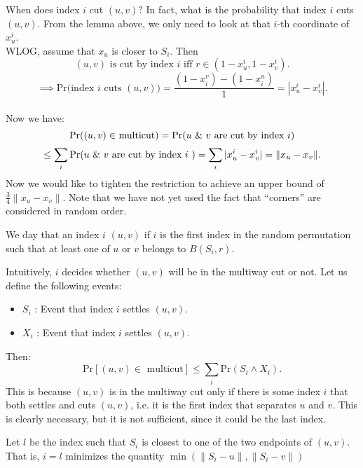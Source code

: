 \documentclass[../main/main.tex]{subfiles}
\begin{document}
When does index $i$ cut $(u,v)?$ In fact, what is the probability that index  $i$ cuts $(u,v).$ From the lemma above, we only need to look at that $i$-th coordinate of $x_u^i$. \\

WLOG, assume that $x_u$ is closer to $S_i$. Then \[\text{$(u,v)$ is cut by index $i$ iff  $r\in (1-x^i_u,1-x^i_v)$}.\] \[
	\implies \text{Pr(index $i$ cuts $(u,v)$)}= \frac{(1-x^v_i)-(1-x^u_i)}{1}=|x^i_u-x^i_v|
.\] \\
Now we have: \[
	\text{Pr($(u,v)\in $ multicut)}= \text{Pr($u $ \& $  v$ are cut by index  $i$)}\] \[
	\le \sum_i \text{Pr($u $ \& $ v$ are cut by index $i$ )}
	=\sum_i |x^i_u-x^i_v|= \|x_u-x_v\|.\] 
Now we would like to tighten the restriction to achieve an upper bound of $\frac{3}{4}\|x_u-x_v\|$. Note that we have not yet used the fact that ``corners'' are considered in random order.

\begin{definition}
	We day that an index $i$  $(u,v)$ if $i$ is the first index in the random permutation such that at least one of $u$ or $v$ belongs to $B(S_i,r)$.
\end{definition} 

Intuitively, $i$ decides whether $(u,v)$ will be in the multiway cut or not. Let us define the following events:
\begin{itemize}
	\item $S_i$ : Event that index  $i$ settles $(u,v)$.
	\item $X_i$ : Event that index $i$ settles $(u,v)$.
\end{itemize}
Then: \[
	\text{Pr}\left[ (u,v)\in \text{ multicut} \right] \le \sum_i \text{Pr}(S_i \wedge X_i)
.\] This is because $(u,v)$ is in the multiway cut only if there is some index $i$ that both settles and cuts $(u,v)$, i.e. it is the first index that separates $u$ and $v$. This is clearly necessary, but it is not sufficient, since it could be the last index.

Let $l$ be the index such that $S_i$ is closest to one of the two endpoints of $(u,v)$. That is, $i=l$ minimizes the quantity $\min\left(\|S_i-u\|,\|S_i-v\|\right)$
\end{document}

